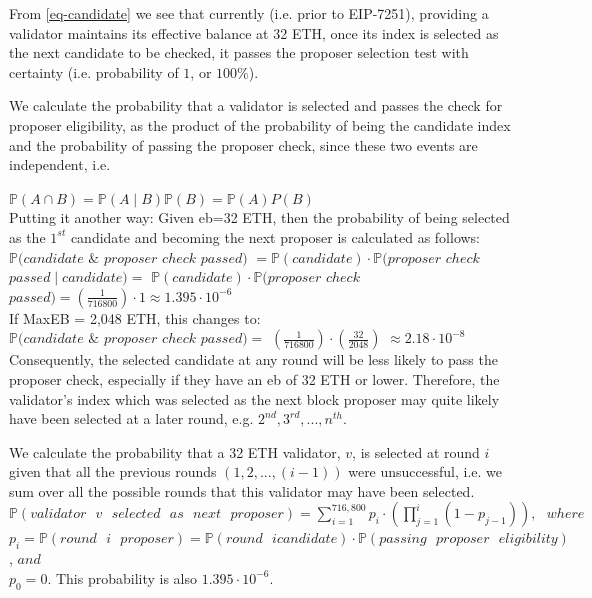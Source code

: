 \documentclass[submission,copyright,creativecommons]{eptcs}
\newcommand{\prob}{\mathbb P}
\begin{document}
From \cref{eq-candidate} we see that currently (i.e. prior to EIP-7251), providing a validator maintains its
effective balance at 32 ETH, once its index is selected as the next candidate
to be checked, it passes the proposer selection test with certainty (i.e.
probability of $1$, or $100\%$).

We calculate the probability that a validator is selected and passes the check for proposer eligibility, as the product of the probability of being the candidate index  and the probability of passing the proposer check, since these two events are independent, i.e. 

$\prob(A \cap B) = \prob(A \mid B)\prob(B) = \prob(A)P(B)$ \\
Putting it another way:
Given \gls{eb}=32 ETH, then the probability of being selected as the $1^{st}$
candidate and becoming the next proposer is calculated as follows: \\
$\prob(candidate$ $\&$ $proposer$ $check$ $passed)$  $= \prob(candidate) \cdot
\prob(proposer$ $check$ $passed \mid candidate) = $ 
$\prob(candidate) \cdot \prob(proposer$
$check$ $passed) = \left(\frac{1}{716800}\right) \cdot 1 \approx 1.395 \cdot 10^{-6}$\\

\noindent
If MaxEB = 2,048 ETH, this changes to: \\
$\prob(candidate$ $\&$ $proposer$ $check$ $passed) =$
$\left(\frac{1}{716800}\right) \cdot \left(\frac{32}{2048}\right)$
$\approx 2.18\cdot 10^{-8}$ \\

\noindent
Consequently, the selected candidate at any round will be less likely to pass the proposer check, especially if they have an \gls{eb} of 32 ETH or lower. Therefore, 
the validator's index which was selected as the next block proposer
may quite likely have been selected at a later round, e.g. $2^{nd}, 3^{rd}, ..., n^{th}$.

We calculate the probability that a 32 ETH validator, $v$, is
selected at round $i$ given that all the previous rounds $(1,2, ... ,(i-1))$
were unsuccessful, i.e. we sum over all the possible rounds that this validator
may have been selected.  \\

\noindent
$\prob(validator \texttt{ } v \texttt{ } selected \texttt{ } as
\texttt{ } next \texttt{ } proposer) = \sum_{i=1}^{716,800} p_i \cdot  \left(
\prod_{j=1}^i (1-p_{j-1}) \right), \texttt{ } where$ \\
$p_i = \prob(round \texttt{ }i \texttt{ } proposer) = \prob(round \texttt{ } i \texttt{
} candidate) \cdot  \prob(passing \texttt{ } proposer \texttt{ } eligibility)$, $and$\\
$p_0 = 0$. This probability is also $1.395 \cdot  10^{-6}$.
\end{document}
